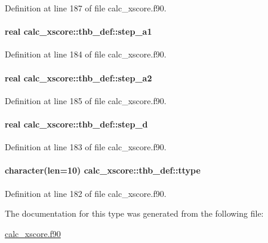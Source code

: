 Definition at line 187 of file calc\-\_\-xscore.\-f90.

\hypertarget{structcalc__xscore_1_1thb__def_aa39b4597b36f86d4f09ea556b12d2885}{
\paragraph[{step\-\_\-a1}]{\setlength{\rightskip}{0pt plus 5cm}real calc\-\_\-xscore\-::thb\-\_\-def\-::step\-\_\-a1}}\label{structcalc__xscore_1_1thb__def_aa39b4597b36f86d4f09ea556b12d2885}


Definition at line 184 of file calc\-\_\-xscore.\-f90.

\hypertarget{structcalc__xscore_1_1thb__def_aba1804dba817ca4c0614e7387e6c8464}{
\paragraph[{step\-\_\-a2}]{\setlength{\rightskip}{0pt plus 5cm}real calc\-\_\-xscore\-::thb\-\_\-def\-::step\-\_\-a2}}\label{structcalc__xscore_1_1thb__def_aba1804dba817ca4c0614e7387e6c8464}


Definition at line 185 of file calc\-\_\-xscore.\-f90.

\hypertarget{structcalc__xscore_1_1thb__def_a41a9940c8cd2829e19aa6d0afcad8812}{
\paragraph[{step\-\_\-d}]{\setlength{\rightskip}{0pt plus 5cm}real calc\-\_\-xscore\-::thb\-\_\-def\-::step\-\_\-d}}\label{structcalc__xscore_1_1thb__def_a41a9940c8cd2829e19aa6d0afcad8812}


Definition at line 183 of file calc\-\_\-xscore.\-f90.

\hypertarget{structcalc__xscore_1_1thb__def_a254c4f2eaafd426d56c90c69ad2c4147}{
\paragraph[{ttype}]{\setlength{\rightskip}{0pt plus 5cm}character(len=10) calc\-\_\-xscore\-::thb\-\_\-def\-::ttype}}\label{structcalc__xscore_1_1thb__def_a254c4f2eaafd426d56c90c69ad2c4147}


Definition at line 182 of file calc\-\_\-xscore.\-f90.



The documentation for this type was generated from the following file\-:\begin{DoxyCompactItemize}
\item 
\hyperlink{calc__xscore_8f90}{calc\-\_\-xscore.\-f90}\end{DoxyCompactItemize}
